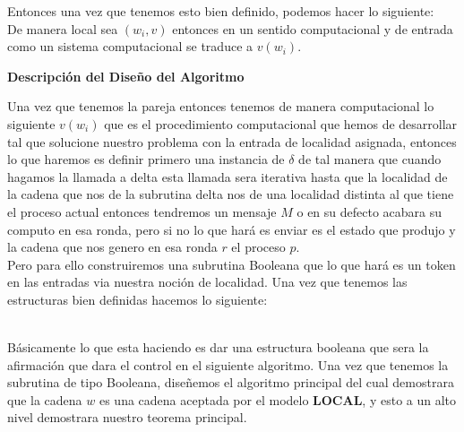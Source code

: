 \documentclass[10pt]{article}
\begin{document}
    Entonces una vez que tenemos esto bien definido, podemos hacer lo siguiente:\\
    De manera local sea $(w_{i},v)$ entonces en un sentido computacional y de entrada como un sistema computacional
    se traduce a $v(w_{i})$.
    \begin{titlepage}
    \textbf{Descripción del Diseño del Algoritmo}
    \end{titlepage}
    \space
    Una vez que tenemos la pareja entonces tenemos de manera computacional lo siguiente $v(w_{i})$ que es el
    procedimiento computacional que hemos de desarrollar tal que solucione nuestro problema con la entrada
    de localidad asignada, entonces lo que haremos es definir primero una instancia de $\delta$ de tal manera
    que cuando hagamos la llamada a delta esta llamada sera iterativa hasta que la localidad de la cadena que nos
    de la subrutina delta nos de una localidad distinta al que tiene el proceso actual entonces tendremos un mensaje
    $M$ o en su defecto acabara su computo en esa ronda, pero si no lo que hará es enviar es el estado que produjo
    y la cadena que nos genero en esa ronda $r$ el proceso $p$.\\
    Pero para ello construiremos una subrutina Booleana que lo que hará es un token en las entradas via nuestra noción
    de localidad.
    Una vez que tenemos las estructuras bien definidas hacemos lo siguiente:
    \\
    \begin{algorithm}
        \begin{algorithmic}
            \ELSE
            \ENDIF
        \end{algorithmic}
        \caption{$Func\char95 Boolean(w_{i},p)$}
    \end{algorithm}
    \\
    Básicamente lo que esta haciendo es dar una estructura booleana que sera la afirmación
    que dara el control en el siguiente algoritmo.
    Una vez que tenemos la subrutina de tipo Booleana, diseñemos el algoritmo principal del cual demostrara que la cadena $w$ es una
    cadena aceptada por el modelo $\textbf{LOCAL}$, y esto a un alto nivel demostrara nuestro teorema principal.
    \\\\
\end{document}
